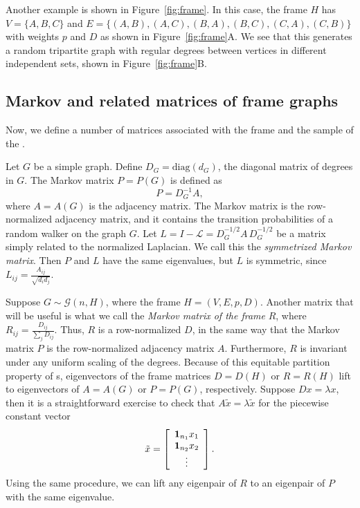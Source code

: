 Another example \kframe is shown in
Figure~\ref{fig:frame}.
In this case, the frame $H$ has 
$V= \{ A, B, C \}$ and 
$E = \{ (A,B), (A,C), (B,A), (B,C), (C,A), (C,B) \}$
with weights $p$ and $D$ as shown in Figure~\ref{fig:frame}A.
We see that this generates a random tripartite graph with 
regular degrees between vertices in different independent sets,
shown in Figure~\ref{fig:frame}B.

\subsection{Markov and related matrices of frame graphs}

Now, we define a number of matrices associated with the frame 
and the sample of the \kframe.

Let $G$ be a simple graph.
Define $D_G = \mathrm{diag}(d_G)$,
the diagonal matrix of degrees in $G$.
The Markov matrix $P=P(G)$ is defined as
\[
P = D_G^{-1} A,
\]
where $A=A(G)$ is the adjacency matrix.
The Markov matrix is the row-normalized adjacency matrix, and it contains
the transition probabilities of a random walker on the graph $G$.
Let $L = I - \mathcal{L} =  D_G^{-1/2} A \, D_G^{-1/2}$
be a matrix simply related to the normalized Laplacian.
We call this the {\it symmetrized Markov matrix}.
Then $P$ and $L$ have the same eigenvalues,
but $L$ is symmetric, since $L_{ij} = \frac{A_{ij}}{ \sqrt{ d_i d_j } }$. 

Suppose $G \sim \mathcal{G}(n, H)$, where the frame $H = (V,E,p, D)$.
Another matrix that will be useful is what we call the 
{\it Markov matrix of the frame}
$R$, where
$R_{ij} = \frac{ D_{ij} }{\sum_j D_{ij}}$.
Thus, $R$ is a row-normalized $D$, 
in the same way that the Markov matrix $P$ is the row-normalized adjacency matrix $A$.
Furthermore, $R$ is invariant under any uniform scaling of the degrees.
Because of this equitable partition property of {\kframe}s, 
eigenvectors of the frame matrices $D=D(H)$ or $R=R(H)$ lift to 
eigenvectors of $A = A(G)$ or $P=P(G)$, respectively.
Suppose $D x = \lambda x$,
then it is a straightforward exercise to check that $A \tilde{x} = \lambda \tilde{x}$ 
for the piecewise constant vector
\[
\tilde{x} = 
\left[
\begin{array}{c}
\mathbf{1}_{n_1} x_1 \\
\mathbf{1}_{n_2} x_2 \\
\vdots
\end{array}
\right] .
\]
Using the same procedure, we can
lift any eigenpair of $R$ to an eigenpair of $P$ with the same eigenvalue.

